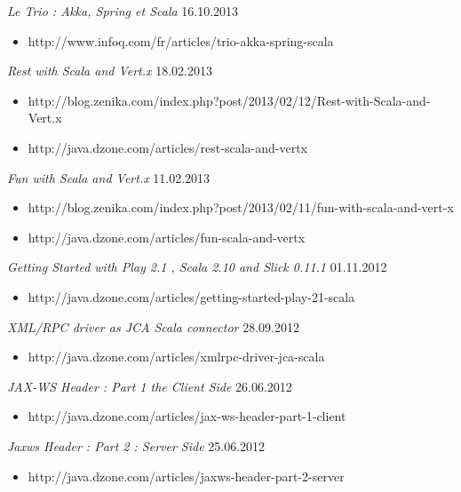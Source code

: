 \documentclass{res}
\begin{document}
\begin{resume}
{\sl Le Trio : Akka, Spring et Scala}  \hfill    16.10.2013	\\
\begin{itemize} %
 \item[] http://www.infoq.com/fr/articles/trio-akka-spring-scala
\end{itemize}

{\sl Rest with Scala and Vert.x}  \hfill    18.02.2013	\\
\begin{itemize}
\item[] http://blog.zenika.com/index.php?post/2013/02/12/Rest-with-Scala-and-Vert.x
\item[] http://java.dzone.com/articles/rest-scala-and-vertx
\end{itemize}

{\sl Fun with Scala and Vert.x}  \hfill    11.02.2013	\\
\begin{itemize}
\item[] http://blog.zenika.com/index.php?post/2013/02/11/fun-with-scala-and-vert-x
\item[] http://java.dzone.com/articles/fun-scala-and-vertx
\end{itemize}

{\sl Getting Started with Play 2.1 , Scala 2.10 and Slick 0.11.1}  \hfill    01.11.2012	\\
\begin{itemize}
\item[] http://java.dzone.com/articles/getting-started-play-21-scala
\end{itemize}

{\sl XML/RPC driver as JCA Scala connector}  \hfill    28.09.2012	\\
\begin{itemize}
\item[] http://java.dzone.com/articles/xmlrpc-driver-jca-scala
\end{itemize}

{\sl JAX-WS Header : Part 1 the Client Side}  \hfill   26.06.2012	\\
\begin{itemize}
\item[] http://java.dzone.com/articles/jax-ws-header-part-1-client
\end{itemize}

{\sl Jaxws Header : Part 2 : Server Side}  \hfill    25.06.2012	\\
\begin{itemize}
\item[] http://java.dzone.com/articles/jaxws-header-part-2-server
\end{itemize}


\end{resume}
\end{document}
